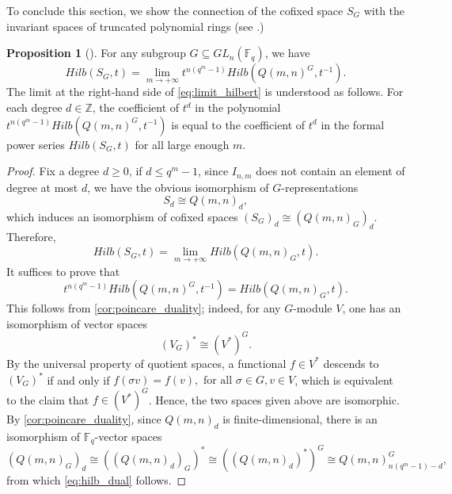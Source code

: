 \documentclass[12pt,a4paper]{report}
\theoremstyle{definition}
\newtheorem{proposition}[theorem]{Proposition}
\theoremstyle{remark}
\theoremstyle{definition}
\begin{document}
To conclude this section, we show the connection of the cofixed space $S_G$ with the invariant spaces of truncated polynomial rings (see .)
\begin{proposition}[{\cite[Corollary 3.5]{Lewis_Reiner_Stanton_2017}}]\label{prop:dual_hilbert_series}
    For any subgroup $G\subseteq GL_n(\mathbb{F}_q)$, we have
    \begin{equation}\label{eq:limit_hilbert}
        Hilb(S_G, t) = \lim\limits_{m\to +\infty}t^{n(q^m-1)}Hilb(Q(m, n)^G, t^{-1}).
    \end{equation}
    The limit at the right-hand side of \eqref{eq:limit_hilbert} is understood as follows. For each degree $d \in \mathbb{Z}$, the coefficient of $t^d$ in the polynomial $t^{n(q^m-1)}Hilb(Q(m, n)^G, t^{-1})$ is equal to the coefficient of $t^d$ in the formal power series $Hilb(S_G, t)$ for all large enough $m$.
\end{proposition}
\begin{proof}
    Fix a degree $d\geq 0$, if $d\leq q^m-1$, since $I_{n, m}$ does not contain an element of degree at most $d$, we have the obvious isomorphism of $G$-representations
    \begin{equation*}
        S_d \cong Q(m, n)_d,
    \end{equation*}
    which induces an isomorphism of cofixed spaces $(S_G)_d \cong (Q(m, n)_G)_d$. Therefore,
    \begin{equation*}
        Hilb(S_G, t) = \lim\limits_{m\to +\infty}Hilb(Q(m, n)_G, t).
    \end{equation*}
    It suffices to prove that
    \begin{equation}\label{eq:hilb_dual}
        t^{n(q^m-1)}Hilb(Q(m, n)^G, t^{-1}) = Hilb(Q(m, n)_G, t).
    \end{equation}
    This follows from \cref{cor:poincare_duality}; indeed, for any $G$-module $V$, one has an isomorphism of vector spaces
    \begin{equation*}
        (V_G)^{*} \cong (V^{*})^G.
    \end{equation*}
    By the universal property of quotient spaces, a functional $f\in V^{*}$ descends to $(V_G)^{*}$ if and only if $f(\sigma v) = f(v), \text{ for all } \sigma\in G, v\in V$, which is equivalent to the claim that $f\in (V^{*})^G$. Hence, the two spaces given above are isomorphic. By \cref{cor:poincare_duality}, since $Q(m, n)_d$ is finite-dimensional, there is an isomorphism of $\mathbb{F}_q$-vector spaces
    \begin{equation*}
        (Q(m, n)_G)_d \cong ((Q(m, n)_d)_G)^{*}\cong ((Q(m, n)_d)^{*})^G \cong Q(m, n)_{n(q^m-1)-d}^G, 
    \end{equation*}
    from which \eqref{eq:hilb_dual} follows.
\end{proof}
\end{document}
